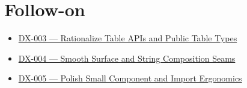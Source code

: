 \section{Follow-on}\label{record-121-follow-on}

\begin{itemize}
\tightlist
\item
  \href{https://github.com/flyingrobots/bijou/blob/cbd70612140e7a450d764b3c7be1c6af878b99bc/docs/method/graveyard/legacy-backlog/DX-003-rationalize-table-apis-and-public-table-types.md}{DX-003 --- Rationalize Table APIs and Public Table Types}
\item
  \href{https://github.com/flyingrobots/bijou/blob/cbd70612140e7a450d764b3c7be1c6af878b99bc/docs/method/graveyard/legacy-backlog/DX-004-smooth-surface-and-string-composition-seams.md}{DX-004 --- Smooth Surface and String Composition Seams}
\item
  \href{https://github.com/flyingrobots/bijou/blob/cbd70612140e7a450d764b3c7be1c6af878b99bc/docs/method/graveyard/legacy-backlog/DX-005-polish-small-component-and-import-ergonomics.md}{DX-005 --- Polish Small Component and Import Ergonomics}
\end{itemize}

